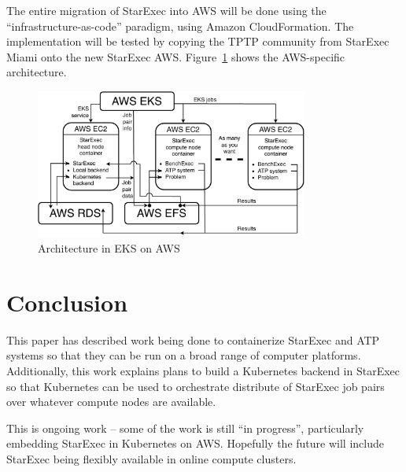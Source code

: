 \documentclass{easychair}
\begin{document}
The entire migration of StarExec into AWS will be done using the ``infrastructure-as-code'' 
paradigm, using Amazon CloudFormation. 
The implementation will be tested by copying the TPTP community from StarExec Miami onto the 
new StarExec AWS.
Figure~\ref{ArchitectureAWS} shows the AWS-specific architecture.

\begin{figure}[htb]
\begin{center}
\includegraphics[width=0.8\textwidth]{ArchitectureAWS}
\caption{Architecture in EKS on AWS}
\label{ArchitectureAWS}
\end{center}
\end{figure}

\section{Conclusion}
\label{Conclusion}

This paper has described work being done to containerize StarExec and ATP systems so that they 
can be run on a broad range of computer platforms.
Additionally, this work explains plans to build a Kubernetes backend in StarExec so that 
Kubernetes can be used to orchestrate distribute of StarExec job pairs over whatever compute 
nodes are available.

This is ongoing work -- some of the work is still ``in progress'', particularly embedding
StarExec in Kubernetes on AWS.
Hopefully the future will include StarExec being flexibly available in online compute clusters.



\appendix
\end{document}
